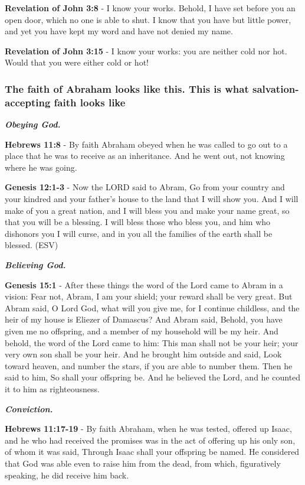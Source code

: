 \documentclass[11pt]{article}
\begin{document}
\textbf{Revelation of John 3:8} - I know your works. Behold, I have set before you an open door, which no one is able to shut. I know that you have but little power, and yet you have kept my word and have not denied my name.

\textbf{Revelation of John 3:15} - I know your works: you are neither cold nor hot. Would that you were either cold or hot!

\subsubsection{The faith of Abraham looks like this. This is what salvation-accepting faith looks like}
\label{sec:orga160497}

\emph{\textbf{Obeying God.}}

\textbf{Hebrews 11:8} - By faith Abraham obeyed when he was called to go out to a place that he was to receive as an inheritance. And he went out, not knowing where he was going.

\textbf{Genesis 12:1-3} - Now the LORD said to Abram, Go from your country and your kindred and your father's house to the land that I will show you. And I will make of you a great nation, and I will bless you and make your name great, so that you will be a blessing. I will bless those who bless you, and him who dishonors you I will curse, and in you all the families of the earth shall be blessed. (ESV)

\emph{\textbf{Believing God.}}

\textbf{Genesis 15:1} - After these things the word of the Lord came to Abram in a vision: Fear not, Abram, I am your shield; your reward shall be very great.  But Abram said, O Lord God, what will you give me, for I continue childless, and the heir of my house is Eliezer of Damascus?  And Abram said, Behold, you have given me no offspring, and a member of my household will be my heir.  And behold, the word of the Lord came to him: This man shall not be your heir; your very own son shall be your heir.  And he brought him outside and said, Look toward heaven, and number the stars, if you are able to number them. Then he said to him, So shall your offspring be.  And he believed the Lord, and he counted it to him as righteousness.

\emph{\textbf{Conviction.}}

\textbf{Hebrews 11:17-19} - By faith Abraham, when he was tested, offered up Isaac, and he who had received the promises was in the act of offering up his only son, of whom it was said, Through Isaac shall your offspring be named. He considered that God was able even to raise him from the dead, from which, figuratively speaking, he did receive him back.
\end{document}

